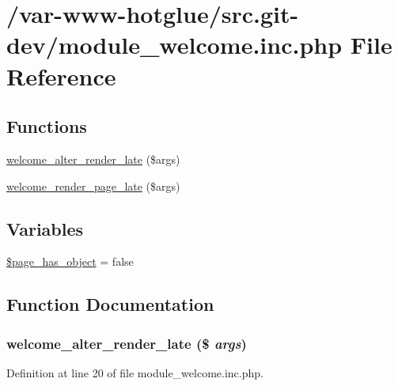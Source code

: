 \hypertarget{module__welcome_8inc_8php}{
\section{/var-\/www-\/hotglue/src.git-\/dev/module\_\-welcome.inc.php File Reference}
\label{module__welcome_8inc_8php}
}
\subsection*{Functions}
\begin{DoxyCompactItemize}
\item 
\hyperlink{module__welcome_8inc_8php_a836aeacf569c4b5ef7021a5cc130daa6}{welcome\_\-alter\_\-render\_\-late} (\$args)
\item 
\hyperlink{module__welcome_8inc_8php_ad04e9602964c582c2927f8fc09f0a7be}{welcome\_\-render\_\-page\_\-late} (\$args)
\end{DoxyCompactItemize}
\subsection*{Variables}
\begin{DoxyCompactItemize}
\item 
\hyperlink{module__welcome_8inc_8php_a5718ac85d1688a52f2d4fedd9a6b4cdf}{\$page\_\-has\_\-object} = false
\end{DoxyCompactItemize}


\subsection{Function Documentation}
\hypertarget{module__welcome_8inc_8php_a836aeacf569c4b5ef7021a5cc130daa6}{
\subsubsection[{welcome\_\-alter\_\-render\_\-late}]{\setlength{\rightskip}{0pt plus 5cm}welcome\_\-alter\_\-render\_\-late (\$ {\em args})}}
\label{module__welcome_8inc_8php_a836aeacf569c4b5ef7021a5cc130daa6}


Definition at line 20 of file module\_\-welcome.inc.php.

